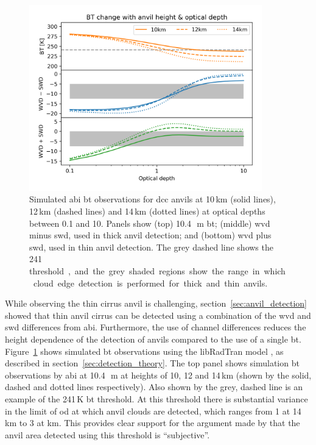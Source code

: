 \begin{figure}[tp]
    \centering
    \includegraphics[width=0.9\textwidth]{figures/chapter3_01.png}
    \caption[
    Simulated \acrshort{abi} \acrshort{bt} observations of \acrshort{dcc} anvils at a range of heights and optical depths for detection of thick and thin anvil detection
    ]{
    Simulated \acrshort{abi} \acrshort{bt} observations for \acrshort{dcc} anvils at 10\,\unit{km} (solid lines), 12\,\unit{km} (dashed lines) and 14\,\unit{km} (dotted lines) at optical depths between 0.1 and 10. Panels show (top) 10.4\,\unit{\mu m} \acrshort{bt}; (middle) \acrshort{wvd} minus \acrshort{swd}, used in thick anvil detection; and (bottom) \acrshort{wvd} plus \acrshort{swd}, used in thin anvil detection. The grey dashed line shows the 241\,\unit[K] threshold, and the grey shaded regions show the range in which cloud edge detection is performed for thick and thin anvils.
    }
    \label{fig:bt_wvd_swd_height_od}
\end{figure}

While observing the thin cirrus anvil is challenging, section~\ref{sec:anvil_detection} showed that thin anvil cirrus can be detected using a combination of the \acrshort{wvd} and \acrshort{swd} differences from \acrshort{abi}.
Furthermore, the use of channel differences reduces the height dependence of the detection of anvils compared to the use of a single \acrshort{bt}.
Figure~\ref{fig:bt_wvd_swd_height_od} shows simulated \acrshort{bt} observations using the libRadTran model \citep{emde_libradtran_2016}, as described in section~\ref{sec:detection_theory}.
The top panel shows simulation \acrshort{bt} observations by \acrshort{abi} at 10.4\,\unit{\mu m} at heights of 10, 12 and 14\,\unit{km} (shown by the solid, dashed and dotted lines respectively).
Also shown by the grey, dashed line is an example of the 241\,\unit{K} \acrshort{bt} threshold.
At this threshold there is substantial variance in the limit of \acrshort{od} at which anvil clouds are detected, which ranges from 1 at 14\,\unit{km} to 3 at \unit{km}.
This provides clear support for the argument made by \citet{augustine_mesoscale_1988} that the anvil area detected using this threshold is ``subjective''.

